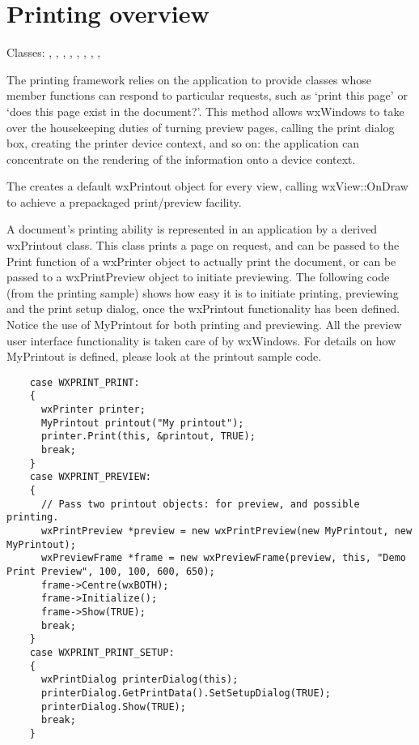 \section{Printing overview}\label{printingoverview}

Classes: , 
, 
, 
, 
, 
, 
, 
, 

The printing framework relies on the application to provide classes
whose member functions can respond to particular requests, such
as `print this page' or `does this page exist in the document?'.
This method allows wxWindows to take over the housekeeping duties of
turning preview pages, calling the print dialog box, creating
the printer device context, and so on: the application can concentrate
on the rendering of the information onto a device context.

The  creates a default wxPrintout
object for every view, calling wxView::OnDraw to achieve a
prepackaged print/preview facility.

A document's printing ability is represented in an application by a
derived wxPrintout class. This class prints a page on request, and can
be passed to the Print function of a wxPrinter object to actually print
the document, or can be passed to a wxPrintPreview object to initiate
previewing. The following code (from the printing sample) shows how easy
it is to initiate printing, previewing and the print setup dialog, once the wxPrintout
functionality has been defined. Notice the use of MyPrintout for
both printing and previewing. All the preview user interface functionality
is taken care of by wxWindows. For details on how MyPrintout is defined,
please look at the printout sample code.

\begin{verbatim}
    case WXPRINT_PRINT:
    {
      wxPrinter printer;
      MyPrintout printout("My printout");
      printer.Print(this, &printout, TRUE);
      break;
    }
    case WXPRINT_PREVIEW:
    {
      // Pass two printout objects: for preview, and possible printing.
      wxPrintPreview *preview = new wxPrintPreview(new MyPrintout, new MyPrintout);
      wxPreviewFrame *frame = new wxPreviewFrame(preview, this, "Demo Print Preview", 100, 100, 600, 650);
      frame->Centre(wxBOTH);
      frame->Initialize();
      frame->Show(TRUE);
      break;
    }
    case WXPRINT_PRINT_SETUP:
    {
      wxPrintDialog printerDialog(this);
      printerDialog.GetPrintData().SetSetupDialog(TRUE);
      printerDialog.Show(TRUE);
      break;
    }
\end{verbatim}

